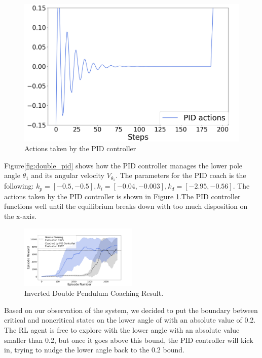 \documentclass[AMS,STIX1COL]{WileyNJD-v2}
\begin{document}
\begin{figure}
\centering
\includegraphics[width=.3\textwidth]{double_PID_actions.png}
\caption{Actions taken by the PID controller}
\label{fig:double_pid_actions}
\end{figure}

Figure\ref{fig:double_pid} shows how the PID controller manages the lower pole angle $\theta_1$ and its angular velocity $V_{\theta_1}$. The parameters for the PID coach is the following: $k_p=[-0.5,-0.5], k_i=[-0.04,-0.003], k_d=[-2.95,-0.56]$. The actions taken by the PID controller is shown in Figure \ref{fig:double_pid_actions}.The PID controller functions well until the equilibrium breaks down with too much disposition on the x-axis.

\begin{figure}
\centering
\includegraphics[width=0.5\textwidth]{double.png}
\caption{Inverted Double Pendulum Coaching Result.}
\label{fig:double_result}
\end{figure}

Based on our observation of the system, we decided to put the boundary between critical and noncritical states on the lower angle of with an absolute value of 0.2. The RL agent is free to explore with the lower angle with an absolute value smaller than 0.2, but once it goes above this bound, the PID controller will kick in, trying to nudge the lower angle back to the 0.2 bound.
\end{document}
